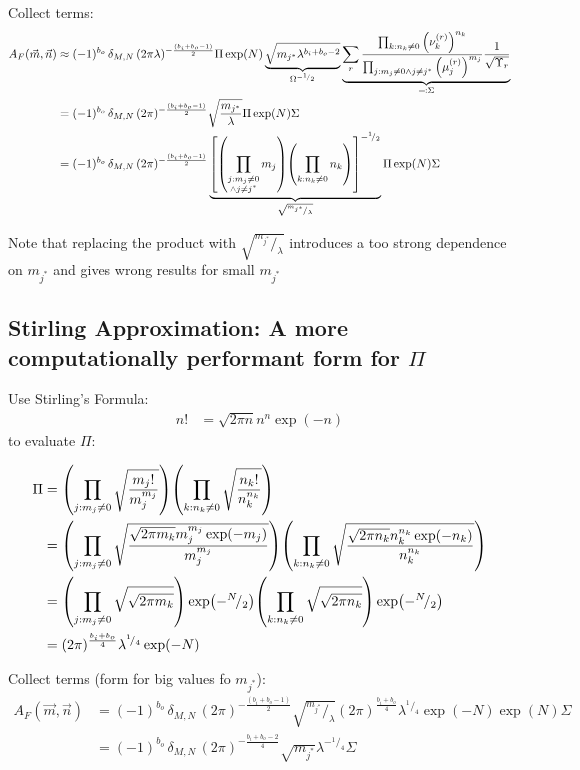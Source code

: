 \documentclass[
	english,
	a4paper,
	fontsize=10pt,
	parskip=half,
	titlepage=true,
	DIV=12,
	final
]{scrreprt}
\newcommand*{\smallfrac}  [2]{\ensuremath{{}^        {#1} \!/_        {#2}}}
\begin{document}
Collect terms:
\begin{align}
		A_F(\vec{m}, \vec{n})
&\approx
	(-1)^{b_o} \,	
	\delta_{M,N} \,
	(2\pi \lambda)^{-\frac{(b_i + b_o - 1)}{2}}
	\Pi
	\exp(N)
	\underbrace{
		\sqrt{m_{j^*} \lambda^{b_i + b_o - 2}}
	}_{\Omega^{-\smallfrac{1}{2}}}
	\underbrace{
		\sum_{r}	
		\frac
			{\prod_{k : n_k \neq 0}                  \qty(\nu_k^{(r)})^{n_k}}
			{\prod_{j : m_j \neq 0 \land j \neq j^*} \qty(\mu_j^{(r)})^{m_j}}
		\frac{1}{\sqrt{\Upsilon_r}}
	}_{\eqqcolon \Sigma} \\
&=
	(-1)^{b_o} \,	
	\delta_{M,N} \,
	(2\pi)^{-\frac{(b_i + b_o - 1)}{2}}
	\sqrt{
		\frac{m_{j^*}}{\lambda}
	}
	\Pi
	\exp(N)
	\Sigma \\
&=
	(-1)^{b_o} \,	
	\delta_{M,N} \,
	(2\pi)^{-\frac{(b_i + b_o - 1)}{2}}
	\underbrace{
		\qty[
			\qty(\prod_{\substack{j : m_j \neq 0\\\land j \neq j^*}} m_j)
			\qty(\prod_{          k : n_k \neq 0                   } n_k)
		]^{-\smallfrac{1}{2}}
	}_{\sqrt{\smallfrac{m_{j^*}}{\lambda}}}
	\Pi
	\exp(N)
	\Sigma
\end{align}

{\color{red}Note that replacing the product with $\sqrt{\smallfrac{m_{j^*}}{\lambda}}$ introduces a too strong dependence on $m_{j^*}$ and gives wrong results for small $m_{j^*}$}

\subsection{Stirling Approximation: A more computationally performant form for $\Pi$}
Use Stirling's Formula:
\begin{align}
	n!
&=
	\sqrt{2\pi n} n^n \exp(-n)
\end{align}
to evaluate $\Pi$:

\begin{align}
	\Pi
&=
	\qty( \prod_{j : m_j \neq 0}
		\sqrt{\frac
			{ m_j! }
			{ m_j^{m_j} }
		}
	)
	\qty( \prod_{k : n_k \neq 0}
		\sqrt{\frac
			{ n_k! }
			{ n_k^{n_k} }
		}
	) \\
&=
	\qty( \prod_{j : m_j \neq 0}
		\sqrt{\frac
			{ \sqrt{2\pi m_k} m_j^{m_j} \exp(-m_j) }
			{ m_j^{m_j} }
		}
	)
	\qty( \prod_{k : n_k \neq 0}
		\sqrt{\frac
			{ \sqrt{2\pi n_k} n_k^{n_k} \exp(-n_k) }
			{ n_k^{n_k} }
		}
	) \\
&=
	\qty( \prod_{j : m_j \neq 0}
		\sqrt{
			\sqrt{2\pi m_k}
		}
	)
	\exp(-\smallfrac{N}{2})
	\qty( \prod_{k : n_k \neq 0}
		\sqrt{
			\sqrt{2\pi n_k}
		}
	)
	\exp(-\smallfrac{N}{2}) \\
&=
	(2\pi)^{\frac{b_i + b_o}{4}}
	\lambda^{\smallfrac{1}{4}}
	\exp(-N)
\end{align}


Collect terms (form for big values fo $m_{j^*}$):
\begin{align}
		A_F(\vec{m}, \vec{n})
&=
	(-1)^{b_o} \,	
	\delta_{M,N} \,
	(2\pi)^{-\frac{(b_i + b_o - 1)}{2}}
	\sqrt{\smallfrac{m_{j^*}}{\lambda}}
	(2\pi)^{\frac{b_i + b_o}{4}}
	\lambda^{\smallfrac{1}{4}}
	\exp(-N)
	\exp(N)
	\Sigma \\
&=
	(-1)^{b_o} \,	
	\delta_{M,N} \,
	(2\pi)^{-\frac{b_i + b_o - 2}{4}}
	\sqrt{m_{j^*}}
	\lambda^{-\smallfrac{1}{4}}
	\Sigma
\end{align}
\end{document}
